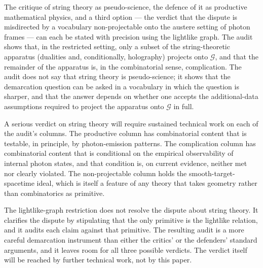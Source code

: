 \documentclass[11pt]{article}
\begin{document}
The critique of string theory as pseudo-science, the defence of it as productive mathematical physics, and a third option --- the verdict that the dispute is misdirected by a vocabulary non-projectable onto the austere setting of photon frames --- can each be stated with precision using the lightlike graph. The audit shows that, in the restricted setting, only a subset of the string-theoretic apparatus (dualities and, conditionally, holography) projects onto $\mathcal{G}$, and that the remainder of the apparatus is, in the combinatorial sense, complication. The audit does not say that string theory is pseudo-science; it shows that the demarcation question can be asked in a vocabulary in which the question is sharper, and that the answer depends on whether one accepts the additional-data assumptions required to project the apparatus onto $\mathcal{G}$ in full.

A serious verdict on string theory will require sustained technical work on each of the audit's columns. The productive column has combinatorial content that is testable, in principle, by photon-emission patterns. The complication column has combinatorial content that is conditional on the empirical observability of internal photon states, and that condition is, on current evidence, neither met nor clearly violated. The non-projectable column holds the smooth-target-spacetime ideal, which is itself a feature of any theory that takes geometry rather than combinatorics as primitive.

The lightlike-graph restriction does not resolve the dispute about string theory. It clarifies the dispute by stipulating that the only primitive is the lightlike relation, and it audits each claim against that primitive. The resulting audit is a more careful demarcation instrument than either the critics' or the defenders' standard arguments, and it leaves room for all three possible verdicts. The verdict itself will be reached by further technical work, not by this paper.
\end{document}
